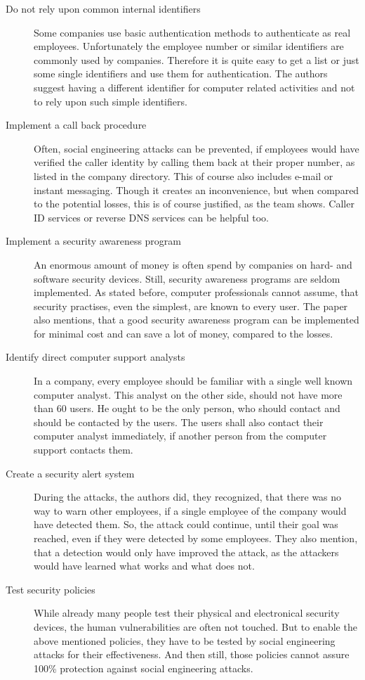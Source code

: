 \begin{description}
  \item[Do not rely upon common internal identifiers] Some companies use basic
  authentication methods to authenticate as real employees. Unfortunately the
  employee number or similar identifiers are commonly used by companies.
  Therefore it is quite easy to get a list or just some single identifiers and
  use them for authentication. The authors suggest having a different
  identifier for computer related activities and not to rely upon such simple
  identifiers.
  \item[Implement a call back procedure] Often, social engineering attacks can
  be prevented, if employees would have verified the caller identity by calling
  them back at their proper number, as listed in the company directory. This of
  course also includes e-mail or instant messaging. Though it creates an
  inconvenience, but when compared to the potential losses, this is of course
  justified, as the team shows. Caller ID services or reverse DNS services can
  be helpful too.
  \item[Implement a security awareness program] An enormous amount of money is
  often spend by companies on hard- and software security devices. Still, security
  awareness programs are seldom implemented. As stated before, computer
  professionals cannot assume, that security practises, even the simplest, are
  known to every user. The paper also mentions, that a good security awareness
  program can be implemented for minimal cost and can save a lot of money,
  compared to the losses.
  \item[Identify direct computer support analysts] In a company, every employee
  should be familiar with a single well known computer analyst. This analyst on
  the other side, should not have more than 60 users. He ought to be the only
  person, who should contact and should be contacted by the users. The users
  shall also contact their computer analyst immediately, if another person
  from the computer support contacts them.
  \item[Create a security alert system] During the attacks, the authors did,
  they recognized, that there was no way to warn other employees, if a single
  employee of the company would have detected them. So, the attack could
  continue, until their goal was reached, even if they were detected by some
  employees. They also mention, that a detection would only have improved the
  attack, as the attackers would have learned what works and what does
  not.
  \item[Test security policies] While already many people test their physical
  and electronical security devices, the human vulnerabilities are often not
  touched. But to enable the above mentioned policies, they have to be tested
  by social engineering attacks for their effectiveness. And then still, those
  policies cannot assure 100\% protection against social engineering attacks.
\end{description}

